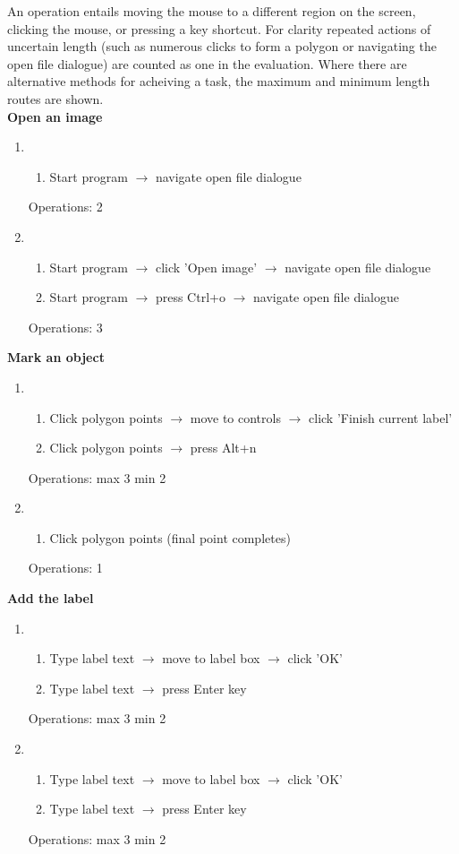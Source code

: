 \documentclass[a4paper,11pt,oneside]{article}
\begin{document}
An operation entails moving the mouse to a different region on the screen, clicking the mouse, or pressing a key shortcut. For clarity repeated actions of uncertain length (such as numerous clicks to form a polygon or navigating the open file dialogue) are counted as one in the evaluation. Where there are alternative methods for acheiving a task, the maximum and minimum length routes are shown.\\

{\bf Open an image}
\begin{enumerate}
    \item
    \begin{enumerate}
        \item Start program $\rightarrow$ navigate open file dialogue
    \end{enumerate}
    Operations: 2
    \item
    \begin{enumerate}
        \item Start program $\rightarrow$ click 'Open image' $\rightarrow$ navigate open file dialogue
        \item Start program $\rightarrow$ press Ctrl+o $\rightarrow$ navigate open file dialogue
    \end{enumerate}
    Operations: 3
\end{enumerate}

{\bf Mark an object}
\begin{enumerate}
    \item
    \begin{enumerate}
        \item Click polygon points $\rightarrow$ move to controls $\rightarrow$ click 'Finish current label'
        \item Click polygon points $\rightarrow$ press Alt+n
    \end{enumerate}
    Operations: max 3 min 2
    \item
    \begin{enumerate}
        \item Click polygon points (final point completes)
    \end{enumerate}
    Operations: 1
\end{enumerate}

{\bf Add the label}
\begin{enumerate}
    \item
    \begin{enumerate}
        \item Type label text $\rightarrow$ move to label box $\rightarrow$ click 'OK'
        \item Type label text $\rightarrow$ press Enter key
    \end{enumerate}
    Operations: max 3 min 2
    \item
    \begin{enumerate}
        \item Type label text $\rightarrow$ move to label box $\rightarrow$ click 'OK'
        \item Type label text $\rightarrow$ press Enter key
    \end{enumerate}
    Operations: max 3 min 2
\end{enumerate}
\end{document}
